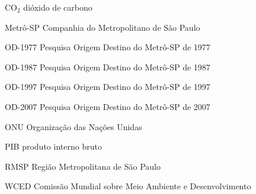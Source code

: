 \documentclass[
  12pt,        %
  openright,      %
  twoside,      %
  a4paper,      %
  english,      %
  brazil        %
]{abntex2}
\begin{document}
\begin{siglas}
  \item[CO$_2$] dióxido de carbono
  \item[Metrô-SP] Companhia do Metropolitano de São Paulo
  \item[OD-1977] Pesquisa Origem Destino do Metrô-SP de 1977
  \item[OD-1987] Pesquisa Origem Destino do Metrô-SP de 1987
  \item[OD-1997] Pesquisa Origem Destino do Metrô-SP de 1997
  \item[OD-2007] Pesquisa Origem Destino do Metrô-SP de 2007
  \item[ONU] Organização das Nações Unidas
  \item[PIB] produto interno bruto
  \item[RMSP] Região Metropolitana de São Paulo
  \item[WCED] Comissão Mundial sobre Meio Ambiente e Desenvolvimento
\end{siglas}


\tableofcontents*
\cleardoublepage



\textual






\end{document}
